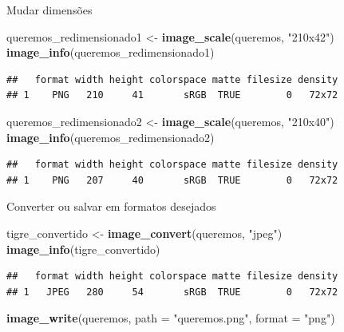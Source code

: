 \documentclass[
  ignorenonframetext,
]{beamer}
\newenvironment{Shaded}{\begin{snugshade}}{\end{snugshade}}
\newcommand{\DataTypeTok}[1]{\textcolor[rgb]{0.13,0.29,0.53}{#1}}
\newcommand{\KeywordTok}[1]{\textcolor[rgb]{0.13,0.29,0.53}{\textbf{#1}}}
\newcommand{\NormalTok}[1]{#1}
\newcommand{\StringTok}[1]{\textcolor[rgb]{0.31,0.60,0.02}{#1}}
\begin{document}
\begin{frame}[fragile]{Mudar dimensões}
\protect\hypertarget{mudar-dimensuxf5es-2}{}

\small

\begin{Shaded}
\begin{Highlighting}[]
\NormalTok{queremos_redimensionado1 <-}\StringTok{ }\KeywordTok{image_scale}\NormalTok{(queremos, }\StringTok{"210x42"}\NormalTok{)}
\KeywordTok{image_info}\NormalTok{(queremos_redimensionado1)}
\end{Highlighting}
\end{Shaded}

\begin{verbatim}
##   format width height colorspace matte filesize density
## 1    PNG   210     41       sRGB  TRUE        0   72x72
\end{verbatim}

\begin{Shaded}
\begin{Highlighting}[]
\NormalTok{queremos_redimensionado2 <-}\StringTok{ }\KeywordTok{image_scale}\NormalTok{(queremos, }\StringTok{"210x40"}\NormalTok{)}
\KeywordTok{image_info}\NormalTok{(queremos_redimensionado2)}
\end{Highlighting}
\end{Shaded}

\begin{verbatim}
##   format width height colorspace matte filesize density
## 1    PNG   207     40       sRGB  TRUE        0   72x72
\end{verbatim}

\end{frame}

\begin{frame}[fragile]{Converter ou salvar em formatos desejados}
\protect\hypertarget{converter-ou-salvar-em-formatos-desejados}{}

\small

\begin{Shaded}
\begin{Highlighting}[]
\NormalTok{tigre_convertido <-}\StringTok{ }\KeywordTok{image_convert}\NormalTok{(queremos, }\StringTok{"jpeg"}\NormalTok{)}
\KeywordTok{image_info}\NormalTok{(tigre_convertido)}
\end{Highlighting}
\end{Shaded}

\begin{verbatim}
##   format width height colorspace matte filesize density
## 1   JPEG   280     54       sRGB  TRUE        0   72x72
\end{verbatim}

\begin{Shaded}
\begin{Highlighting}[]
\KeywordTok{image_write}\NormalTok{(queremos, }\DataTypeTok{path =} \StringTok{"queremos.png"}\NormalTok{, }\DataTypeTok{format =} \StringTok{"png"}\NormalTok{)}
\end{Highlighting}
\end{Shaded}

\end{frame}
\end{document}
